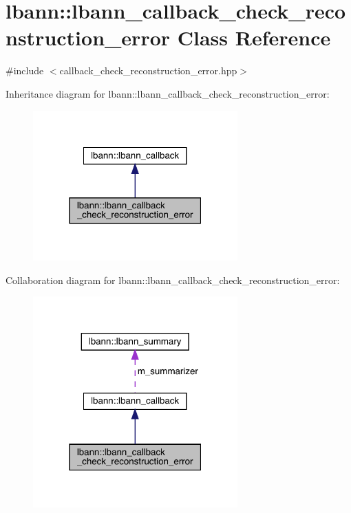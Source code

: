 \hypertarget{classlbann_1_1lbann__callback__check__reconstruction__error}{}\section{lbann\+:\+:lbann\+\_\+callback\+\_\+check\+\_\+reconstruction\+\_\+error Class Reference}
\label{classlbann_1_1lbann__callback__check__reconstruction__error}


{\ttfamily \#include $<$callback\+\_\+check\+\_\+reconstruction\+\_\+error.\+hpp$>$}



Inheritance diagram for lbann\+:\+:lbann\+\_\+callback\+\_\+check\+\_\+reconstruction\+\_\+error\+:\nopagebreak
\begin{figure}[H]
\begin{center}
\leavevmode
\includegraphics[width=223pt]{classlbann_1_1lbann__callback__check__reconstruction__error__inherit__graph}
\end{center}
\end{figure}


Collaboration diagram for lbann\+:\+:lbann\+\_\+callback\+\_\+check\+\_\+reconstruction\+\_\+error\+:\nopagebreak
\begin{figure}[H]
\begin{center}
\leavevmode
\includegraphics[width=223pt]{classlbann_1_1lbann__callback__check__reconstruction__error__coll__graph}
\end{center}
\end{figure}

